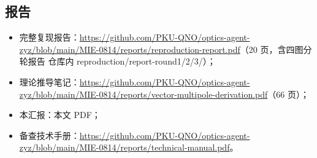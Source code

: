\subsection{报告}

\begin{itemize}
  \item 完整复现报告：\url{https://github.com/PKU-QNO/optics-agent-zyz/blob/main/MIE-0814/reports/reproduction-report.pdf}（20 页，含四图分轮报告 仓库内 reproduction/report-round1/2/3/）；
  \item 理论推导笔记：\url{https://github.com/PKU-QNO/optics-agent-zyz/blob/main/MIE-0814/reports/vector-multipole-derivation.pdf}（66 页）；
  \item 本汇报：本文 PDF；
  \item 备查技术手册：\url{https://github.com/PKU-QNO/optics-agent-zyz/blob/main/MIE-0814/reports/technical-manual.pdf}。
\end{itemize}
